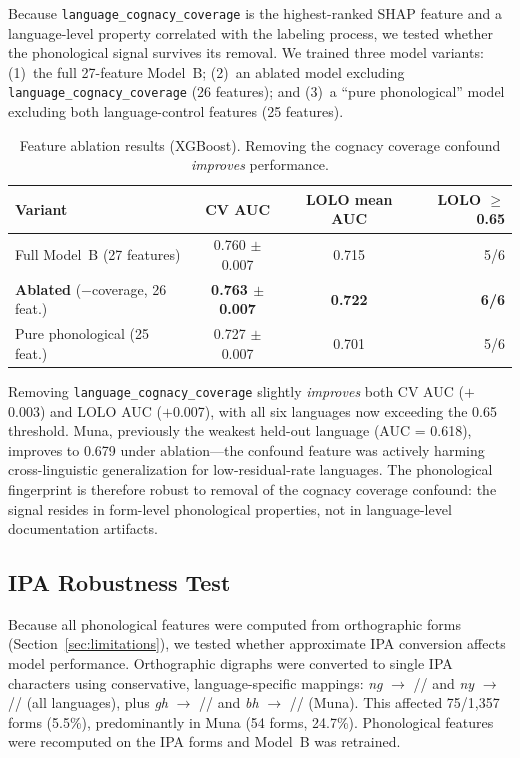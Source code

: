 \documentclass[12pt]{article}
\begin{document}
Because \texttt{language\_cognacy\_coverage} is the highest-ranked SHAP feature and a language-level property correlated with the labeling process, we tested whether the phonological signal survives its removal.
We trained three model variants: (1)~the full 27-feature Model~B; (2)~an ablated model excluding \texttt{language\_cognacy\_coverage} (26 features); and (3)~a ``pure phonological'' model excluding both language-control features (25 features).

\begin{table}[H]
\centering
\caption{Feature ablation results (XGBoost). Removing the cognacy coverage confound \textit{improves} performance.}
\label{tab:ablation}
\begin{tabular}{lccr}
\toprule
Variant & CV AUC & LOLO mean AUC & LOLO $\geq$0.65 \\
\midrule
Full Model~B (27 features) & 0.760 $\pm$ 0.007 & 0.715 & 5/6 \\
\textbf{Ablated} ($-$coverage, 26 feat.) & \textbf{0.763 $\pm$ 0.007} & \textbf{0.722} & \textbf{6/6} \\
Pure phonological (25 feat.) & 0.727 $\pm$ 0.007 & 0.701 & 5/6 \\
\bottomrule
\end{tabular}
\end{table}

Removing \texttt{language\_cognacy\_coverage} slightly \textit{improves} both CV AUC ($+$0.003) and LOLO AUC ($+$0.007), with all six languages now exceeding the 0.65 threshold.
Muna, previously the weakest held-out language (AUC = 0.618), improves to 0.679 under ablation---the confound feature was actively harming cross-linguistic generalization for low-residual-rate languages.
The phonological fingerprint is therefore robust to removal of the cognacy coverage confound: the signal resides in form-level phonological properties, not in language-level documentation artifacts.

\subsection{IPA Robustness Test}
\label{sec:results_ipa}

Because all phonological features were computed from orthographic forms (Section~\ref{sec:limitations}), we tested whether approximate IPA conversion affects model performance.
Orthographic digraphs were converted to single IPA characters using conservative, language-specific mappings: \textit{ng} $\rightarrow$ // and \textit{ny} $\rightarrow$ /\textipa{\textltailn}/ (all languages), plus \textit{gh} $\rightarrow$ // and \textit{bh} $\rightarrow$ // (Muna).
This affected 75/1,357 forms (5.5\%), predominantly in Muna (54 forms, 24.7\%).
Phonological features were recomputed on the IPA forms and Model~B was retrained.
\end{document}
